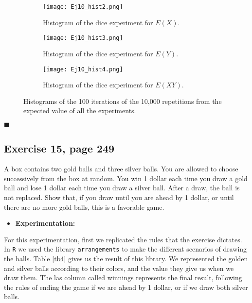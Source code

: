 \documentclass{article}
\begin{document}
\begin{figure}[]
\begin{subfigure}{.3\textwidth}
  \centering
  \texttt{[image: Ej10\_hist2.png]}  
  \caption{Histogram of the dice experiment for $E(X)$. }
  \label{sb3-1}
\end{subfigure}\hspace{5mm}%
\begin{subfigure}{.3\textwidth}
  \centering
  \texttt{[image: Ej10\_hist3.png]}  
  \caption{Histogram of the dice experiment for $E(Y)$. }
  \label{sb3-2}
\end{subfigure}\hspace{5mm}%
\begin{subfigure}{.3\textwidth}
  \centering
  \texttt{[image: Ej10\_hist4.png]}  
  \caption{Histogram of the dice experiment for $E(XY)$.}
  \label{sb3-3}
\end{subfigure}
	\caption{Histograms of the 100 iterations of the 10,000 repetitions from the expected value of all the experiments.}
\label{fig3}
\end{figure}
 
\begin{flushright}
$\blacksquare$
\end{flushright}


\subsection{Exercise 15, page 249}

A box contains two gold balls and three silver balls. You are allowed to choose successively from the box at random. You win 1 dollar each time you draw a gold ball and lose 1 dollar each time you draw a silver ball. After a draw, the ball is not replaced. Show that, if you draw until you are ahead by 1 dollar, or until there are no more gold balls, this is a favorable game.\\

\begin{itemize}
\item \textbf{Experimentation:}
\end{itemize}

For this experimentation, first we replicated the rules that the exercise dictates. In \texttt{R} we used the library \texttt{arrangements} to make the different scenarios of drawing the balls. Table \ref{tb4} gives us the result of this library. We represented the golden and silver balls according to their colors, and the value they give us when we draw them. The las column called winnings represents the final result, following the rules of ending the game if we are ahead by 1 dollar, or if we draw both silver balls.\\
\end{document}
